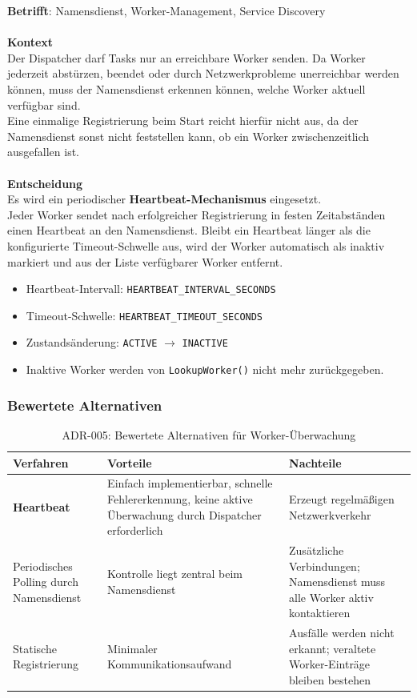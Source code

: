 \textbf{Betrifft}: Namensdienst, Worker-Management, Service Discovery
\\\\
\noindent\textbf{Kontext}\\
\noindent Der Dispatcher darf Tasks nur an erreichbare Worker senden.
Da Worker jederzeit abstürzen, beendet oder durch Netzwerkprobleme
unerreichbar werden können, muss der Namensdienst erkennen können,
welche Worker aktuell verfügbar sind.
\\
Eine einmalige Registrierung beim Start reicht hierfür nicht aus,
da der Namensdienst sonst nicht feststellen kann, ob ein Worker
zwischenzeitlich ausgefallen ist.
\\\\
\noindent \textbf{Entscheidung}\\
\noindent Es wird ein periodischer \textbf{Heartbeat-Mechanismus} eingesetzt.\\
Jeder Worker sendet nach erfolgreicher Registrierung in festen
Zeitabständen einen Heartbeat an den Namensdienst.
Bleibt ein Heartbeat länger als die konfigurierte Timeout-Schwelle aus,
wird der Worker automatisch als inaktiv markiert und aus der Liste
verfügbarer Worker entfernt.

\begin{itemize}
	\item Heartbeat-Intervall: \texttt{HEARTBEAT\_INTERVAL\_SECONDS}
	\item Timeout-Schwelle: \texttt{HEARTBEAT\_TIMEOUT\_SECONDS}
	\item Zustandsänderung: \texttt{ACTIVE} $\rightarrow$ \texttt{INACTIVE}
	\item Inaktive Worker werden von \texttt{LookupWorker()} nicht mehr zurückgegeben.
\end{itemize}

\subsubsection*{Bewertete Alternativen}

\begin{table}[H]
	\centering
	\begin{tabular}{m{3.25cm} m{6.25cm} m{6.5cm}}
		\toprule
		\textbf{Verfahren} & \textbf{Vorteile} & \textbf{Nachteile} \\
		\midrule
		\textbf{Heartbeat} &
		Einfach implementierbar, schnelle Fehlererkennung, keine aktive Überwachung durch Dispatcher erforderlich &
		Erzeugt regelmäßigen Netzwerkverkehr \\
		\midrule
		Periodisches Polling durch Namensdienst &
		Kontrolle liegt zentral beim Namensdienst &
		Zusätzliche Verbindungen; Namensdienst muss alle Worker aktiv kontaktieren \\
		\midrule
		Statische Registrierung &
		Minimaler Kommunikationsaufwand &
		Ausfälle werden nicht erkannt; veraltete Worker-Einträge bleiben bestehen \\
		\bottomrule
	\end{tabular}
	\caption{ADR-005: Bewertete Alternativen für Worker-Überwachung}
\end{table}

